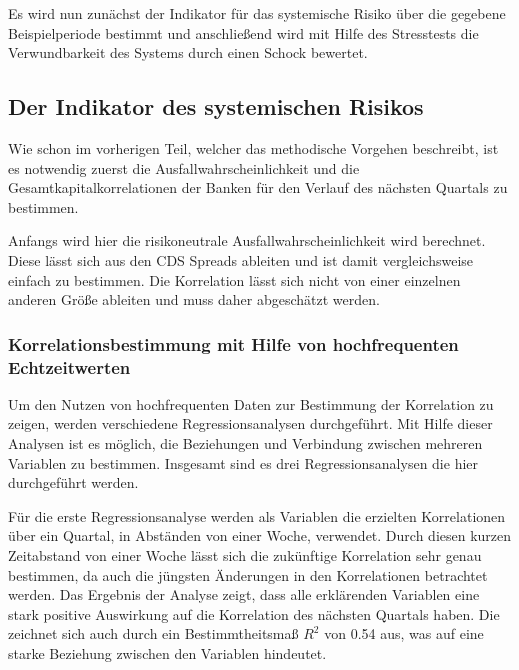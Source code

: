 \documentclass[a4paper,12pt]{scrartcl}
\begin{document}
Es wird nun zunächst der Indikator für das systemische Risiko über die gegebene Beispielperiode bestimmt und anschließend wird mit Hilfe des Stresstests die Verwundbarkeit des Systems durch einen Schock bewertet.

\subsection{Der Indikator des systemischen Risikos}
Wie schon im vorherigen Teil, welcher das methodische Vorgehen beschreibt, ist es notwendig zuerst die Ausfallwahrscheinlichkeit und die Gesamtkapitalkorrelationen der Banken für den Verlauf des nächsten Quartals zu bestimmen.

Anfangs wird hier die risikoneutrale Ausfallwahrscheinlichkeit wird berechnet. Diese lässt sich aus den CDS Spreads ableiten und ist damit vergleichsweise einfach zu bestimmen.
Die Korrelation lässt sich nicht von einer einzelnen anderen Größe ableiten und muss daher abgeschätzt werden.


\subsubsection{Korrelationsbestimmung mit Hilfe von hochfrequenten Echtzeitwerten}
Um den Nutzen von hochfrequenten Daten zur Bestimmung der Korrelation zu zeigen,  werden verschiedene Regressionsanalysen durchgeführt. Mit Hilfe dieser Analysen ist es möglich, die Beziehungen und Verbindung zwischen mehreren Variablen zu bestimmen.
Insgesamt sind es drei Regressionsanalysen die hier durchgeführt werden.

Für die erste Regressionsanalyse werden als Variablen die erzielten Korrelationen über ein Quartal, in Abständen von einer Woche, verwendet. Durch diesen kurzen Zeitabstand von einer Woche lässt sich die zukünftige Korrelation sehr genau bestimmen, da auch die jüngsten Änderungen in den Korrelationen betrachtet werden. 
Das Ergebnis der Analyse zeigt, dass alle erklärenden Variablen eine stark positive Auswirkung auf die Korrelation des nächsten Quartals haben. Die zeichnet sich auch durch ein Bestimmtheitsmaß $R^2$ von 0.54 aus, was auf eine starke Beziehung zwischen den Variablen hindeutet.
\end{document}
